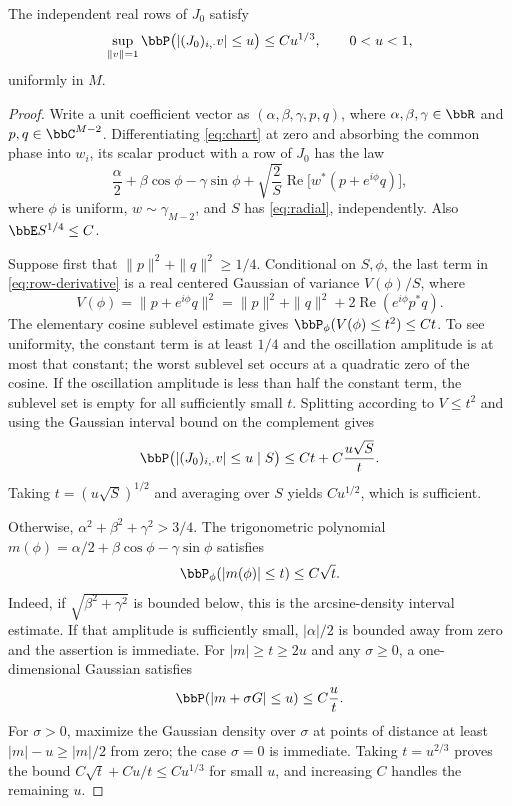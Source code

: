 \documentclass[11pt,reqno]{amsart}
\begin{document}
\begin{lem}\label{lem:smallball}
The independent real rows of $J_0$ satisfy
\begin{equation}\label{eq:smallball}
 \sup_{\|v\|=1}\bbP\bigl(|(J_0)_{i,\cdot}v|\le u\bigr)\le Cu^{1/3},
 \qquad 0<u<1,
\end{equation}
uniformly in $M$.
\end{lem}

\begin{proof}
Write a unit coefficient vector as $(\alpha,\beta,\gamma,p,q)$, where $\alpha,\beta,\gamma\in\bbR$ and $p,q\in\bbC^{M-2}$. Differentiating \eqref{eq:chart} at zero and absorbing the common phase into $w_i$, its scalar product with a row of $J_0$ has the law
\begin{equation}\label{eq:row-derivative}
 \frac\alpha2+\beta\cos\phi-\gamma\sin\phi
 +\sqrt{\frac2S}\operatorname{Re}\bigl[w^*(p+e^{i\phi}q)\bigr],
\end{equation}
where $\phi$ is uniform, $w\sim\gamma_{M-2}$, and $S$ has \eqref{eq:radial}, independently. Also $\bbE S^{1/4}\le C$.

Suppose first that $\|p\|^2+\|q\|^2\ge1/4$. Conditional on $S,\phi$, the last term in \eqref{eq:row-derivative} is a real centered Gaussian of variance $V(\phi)/S$, where
\[
 V(\phi)=\|p+e^{i\phi}q\|^2
 =\|p\|^2+\|q\|^2+2\operatorname{Re}(e^{i\phi}p^*q).
\]
The elementary cosine sublevel estimate gives $\bbP_\phi(V(\phi)\le t^2)\le Ct$. To see uniformity, the constant term is at least $1/4$ and the oscillation amplitude is at most that constant; the worst sublevel set occurs at a quadratic zero of the cosine. If the oscillation amplitude is less than half the constant term, the sublevel set is empty for all sufficiently small $t$.
Splitting according to $V\le t^2$ and using the Gaussian interval bound on the complement gives
\[
 \bbP\bigl(|(J_0)_{i,\cdot}v|\le u\mid S\bigr)
 \le Ct+C\frac{u\sqrt S}{t}.
\]
Taking $t=(u\sqrt S)^{1/2}$ and averaging over $S$ yields $Cu^{1/2}$, which is sufficient.

Otherwise, $\alpha^2+\beta^2+\gamma^2>3/4$. The trigonometric polynomial
$m(\phi)=\alpha/2+\beta\cos\phi-\gamma\sin\phi$ satisfies
\[
 \bbP_\phi(|m(\phi)|\le t)\le C\sqrt t.
\]
Indeed, if $\sqrt{\beta^2+\gamma^2}$ is bounded below, this is the arcsine-density interval estimate. If that amplitude is sufficiently small, $|\alpha|/2$ is bounded away from zero and the assertion is immediate.
For $|m|\ge t\ge2u$ and any $\sigma\ge0$, a one-dimensional Gaussian satisfies
\[
 \bbP(|m+\sigma G|\le u)\le C\frac{u}{t}.
\]
For $\sigma>0$, maximize the Gaussian density over $\sigma$ at points of distance at least $|m|-u\ge|m|/2$ from zero; the case $\sigma=0$ is immediate. Taking $t=u^{2/3}$ proves the bound $C\sqrt t+Cu/t\le Cu^{1/3}$ for small $u$, and increasing $C$ handles the remaining $u$.
\end{proof}
\end{document}
